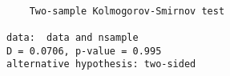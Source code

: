 \begin{verbatim} 

	Two-sample Kolmogorov-Smirnov test

data:  data and nsample
D = 0.0706, p-value = 0.995
alternative hypothesis: two-sided

\end{verbatim}